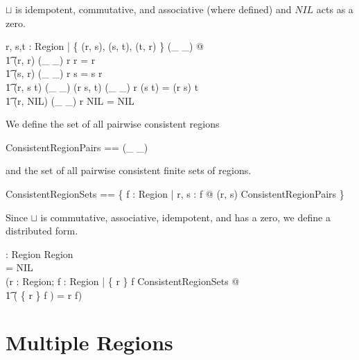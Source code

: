 \documentclass[a4paper,9pt]{article}
\begin{document}
$\sqcup$ is idempotent, commutative, and associative (where defined) and $NIL$ acts as a zero.
\begin{argue}
  \shows \forall r, s,t : Region | \{ (r, s), (s, t), (t, r) \} \subseteq \dom(\_ \sqcup \_) @ \\
\t1 (r, r) \in \dom(\_ \sqcup \_) \land r \sqcup r = r \land \\
\t1 (s, r) \in \dom(\_ \sqcup \_) \land r \sqcup s = s \sqcup r \land \\
\t1 (r, s \sqcup t) \in \dom(\_ \sqcup \_) \land (r \sqcup s, t) \in \dom(\_ \sqcup \_) \land r \sqcup (s \sqcup t) = (r \sqcup s) \sqcup t \land \\
\t1 (r, NIL) \in \dom(\_ \sqcup \_) \land r \sqcup NIL = NIL \\
\end{argue}

We define the set of all pairwise consistent regions
\begin{zed}
  ConsistentRegionPairs == \dom(\_ \sqcup \_) \\
\end{zed}
and the set of all pairwise consistent finite sets of regions.
\begin{zed}
  ConsistentRegionSets == \{ f : \finset Region | \forall r, s : f @ (r, s) \in ConsistentRegionPairs \} \\
\end{zed}

Since $\sqcup$ is commutative, associative, idempotent, and has a zero, we define a distributed form.
\begin{axdef}
  \bigsqcup : \finset Region \pfun Region \\
\where
  \bigsqcup \emptyset = NIL \land \\
  (\forall r : Region; f : \finset Region | \{ r \} \cup f \in ConsistentRegionSets @ \\
\t1 \bigsqcup( \{ r \} \cup f ) = r \sqcup \bigsqcup f) \\ 
\end{axdef}
  
\clearpage
\section{Multiple Regions}
\label{cha:multiregions}
\end{document}

